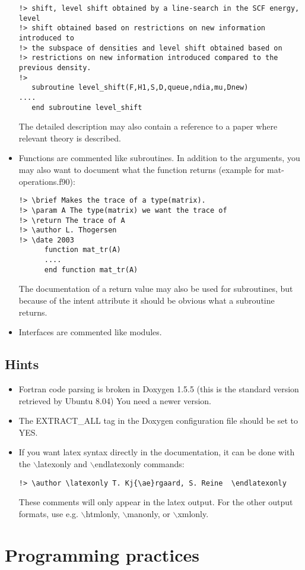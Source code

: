 \documentclass[preprint,aps]{revtex4}
\begin{document}
\begin{itemize}
\begin{verbatim}
!> shift, level shift obtained by a line-search in the SCF energy, level 
!> shift obtained based on restrictions on new information introduced to 
!> the subspace of densities and level shift obtained based on
!> restrictions on new information introduced compared to the previous density.
!>
   subroutine level_shift(F,H1,S,D,queue,ndia,mu,Dnew)
....
   end subroutine level_shift
\end{verbatim}
The detailed description may also contain a reference to a paper where relevant theory is described.
\item Functions are commented like subroutines. In addition to the arguments, you may also
want to document what the function returns (example for mat-operations.f90):
\begin{verbatim}
!> \brief Makes the trace of a type(matrix).
!> \param A The type(matrix) we want the trace of
!> \return The trace of A
!> \author L. Thogersen
!> \date 2003
      function mat_tr(A)
      ....
      end function mat_tr(A)
\end{verbatim}
The documentation of a return value may also be used for subroutines, but because of the intent
attribute it should be obvious what a subroutine returns.
\item Interfaces are commented like modules. 
\end{itemize}

\subsection{Hints}
\begin{itemize}
\item Fortran code parsing is broken in Doxygen 1.5.5 (this is the standard version retrieved by Ubuntu 8.04) You need a newer version.
\item The EXTRACT\_ALL tag in the Doxygen configuration file should be set to YES.
\item If you want latex syntax directly in the documentation, it can be done with the ${\backslash}$latexonly and 
${\backslash}$endlatexonly commands:
\begin{verbatim}
!> \author \latexonly T. Kj{\ae}rgaard, S. Reine  \endlatexonly
\end{verbatim}
These comments will only appear in the latex output. For the other output formats, use e.g. ${\backslash}$htmlonly, 
${\backslash}$manonly, or ${\backslash}$xmlonly.
\end{itemize}

\section{Programming practices}
\end{document}
